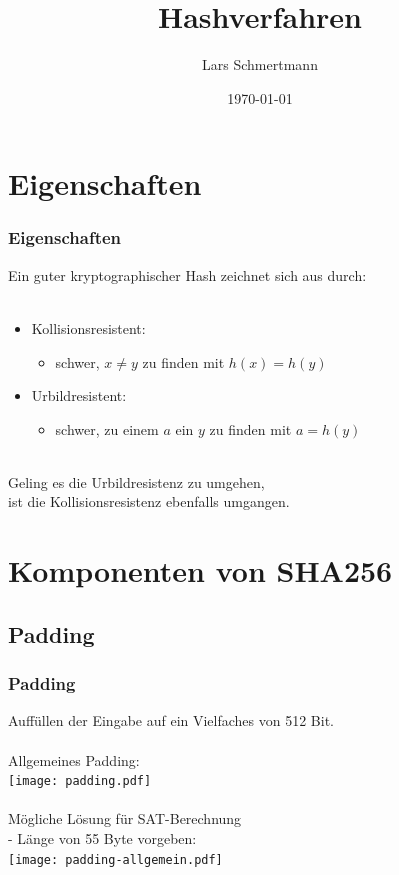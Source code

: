 \documentclass{beamer}
\title{Hashverfahren}
\author{Lars Schmertmann}
\date{\today}
\begin{document}
\maketitle
\frame{\tableofcontents[currentsection]}

\section{Eigenschaften}
  \begin{frame}
    \frametitle{Eigenschaften}
    Ein guter kryptographischer Hash zeichnet sich aus durch:\\
    ~\\
    \begin{itemize}
      \setlength{\itemsep}{20pt}
      \item Kollisionsresistent:
      \begin{itemize}
        \item schwer, $ x \neq y $ zu finden mit $ h(x) = h(y) $
      \end{itemize}
      \item Urbildresistent:
      \begin{itemize}
        \item schwer, zu einem $ a $ ein $ y $ zu finden mit $ a = h(y) $
      \end{itemize}
    \end{itemize}
    ~\\
    Geling es die Urbildresistenz zu umgehen,\\
    ist die Kollisionsresistenz ebenfalls umgangen.
  \end{frame}

\section{Komponenten von SHA256}
\subsection{Padding}
  \begin{frame}
    \frametitle{Padding}
    Auffüllen der Eingabe auf ein Vielfaches von 512 Bit.\\
    ~\\
    Allgemeines Padding:\\
    \texttt{[image: padding.pdf]}\\
    \pause~\\
    Mögliche Lösung für SAT-Berechnung\\
    - Länge von 55 Byte vorgeben:\\
    \texttt{[image: padding-allgemein.pdf]}
  \end{frame}
\end{document}
